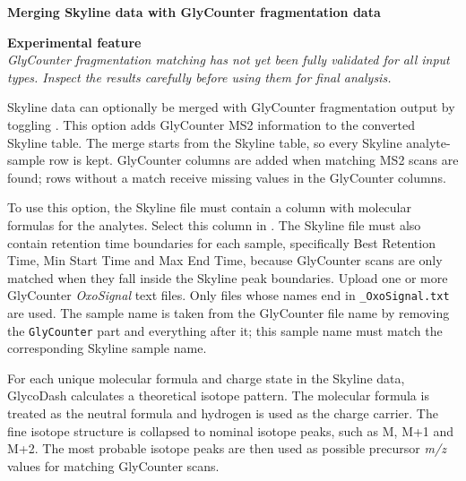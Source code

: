 \begin{optionalbox}
	\textbf{Merging Skyline data with GlyCounter fragmentation data} \vspace{1em} 
	
	\textcolor{warningorange}{
		\textbf{Experimental feature} \\
		\textsl{
			GlyCounter fragmentation matching has not yet been fully validated for all input types.
			Inspect the results carefully before using them for final analysis.
		}
	} \vspace{.5em}

	Skyline data can optionally be merged with GlyCounter fragmentation output by toggling .
	This option adds GlyCounter MS2 information to the converted Skyline table.
	The merge starts from the Skyline table, so every Skyline analyte-sample row is kept.
	GlyCounter columns are added when matching MS2 scans are found; rows without a match receive missing values in the GlyCounter columns. \vspace{.5em} 

	To use this option, the Skyline file must contain a column with molecular formulas for the analytes.
	Select this column in .
	The Skyline file must also contain retention time boundaries for each sample, specifically \textsf{Best Retention Time}, \textsf{Min Start Time} and \textsf{Max End Time}, because GlyCounter scans are only matched when they fall inside the Skyline peak boundaries.
	Upload one or more GlyCounter \textit{OxoSignal} text files.
	Only files whose names end in \texttt{\_OxoSignal.txt} are used.
	The sample name is taken from the GlyCounter file name by removing the \texttt{GlyCounter} part and everything after it; this sample name must match the corresponding Skyline sample name. \vspace{.5em}

	For each unique molecular formula and charge state in the Skyline data, GlycoDash calculates a theoretical isotope pattern.
	The molecular formula is treated as the neutral formula and hydrogen is used as the charge carrier.
	The fine isotope structure is collapsed to nominal isotope peaks, such as \textsf{M}, \textsf{M+1} and \textsf{M+2}.
	The most probable isotope peaks are then used as possible precursor \textit{m/z} values for matching GlyCounter scans. \vspace{.5em}


\end{optionalbox}
